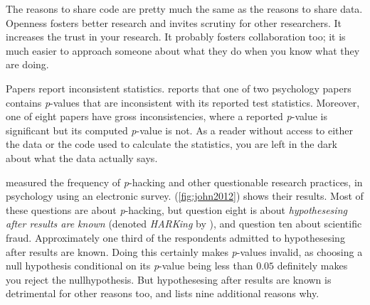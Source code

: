 The reasons to share code are pretty much the same as the reasons
to share data. Openness fosters better research and invites scrutiny
for other researchers. It increases the trust in your research. It
probably fosters collaboration too; it is much easier to approach
someone about what they do when you know what they are doing.

Papers report inconsistent statistics. \cite{Nuijten2016-eu} reports
that one of two psychology papers contains \emph{p}-values that are
inconsistent with its reported test statistics. Moreover, one of eight
papers have gross inconsistencies, where a reported \emph{p}-value
is significant but its computed \emph{p}-value is not. As a reader
without access to either the data or the code used to calculate the
statistics, you are left in the dark about what the data actually
says.

\cite{John2012-xp} measured the frequency of \emph{p}-hacking and
other questionable research practices, in psychology using an electronic
survey. (\ref{fig:john2012}) shows their results. Most of these questions
are about \emph{p}-hacking, but question eight is about \emph{hypothesesing
after results are known} (denoted \emph{HARKing} by \cite{Kerr1998-by}),
and question ten about scientific fraud. Approximately one third of
the respondents admitted to hypothesesing after results are known.
Doing this certainly makes \emph{p}-values invalid, as choosing a
null hypothesis conditional on its \emph{p}-value being less than
$0.05$ definitely makes you reject the nullhypothesis. But hypothesesing
after results are known is detrimental for other reasons too, and
\cite[p. 205]{Kerr1998-by} lists nine additional reasons why.

